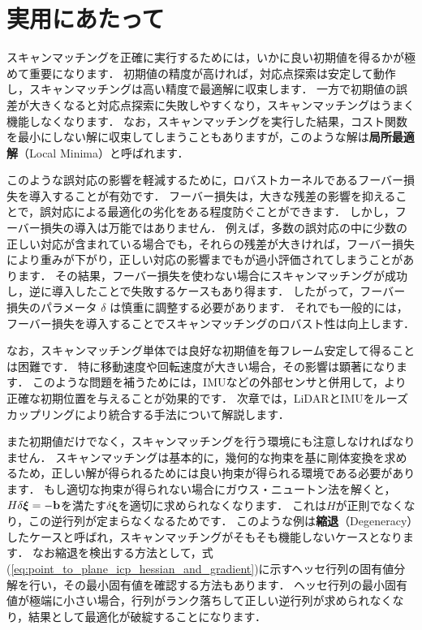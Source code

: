 \section{実用にあたって}
\label{sec:scan_matching_実用にあたって}

スキャンマッチングを正確に実行するためには，いかに良い初期値を得るかが極めて重要になります．
初期値の精度が高ければ，対応点探索は安定して動作し，スキャンマッチングは高い精度で最適解に収束します．
一方で初期値の誤差が大きくなると対応点探索に失敗しやすくなり，スキャンマッチングはうまく機能しなくなります．
なお，スキャンマッチングを実行した結果，コスト関数を最小にしない解に収束してしまうこともありますが，このような解は{\bf 局所最適解}（Local Minima）と呼ばれます．

このような誤対応の影響を軽減するために，ロバストカーネルであるフーバー損失を導入することが有効です．
フーバー損失は，大きな残差の影響を抑えることで，誤対応による最適化の劣化をある程度防ぐことができます．
しかし，フーバー損失の導入は万能ではありません．
例えば，多数の誤対応の中に少数の正しい対応が含まれている場合でも，それらの残差が大きければ，フーバー損失により重みが下がり，正しい対応の影響までもが過小評価されてしまうことがあります．
その結果，フーバー損失を使わない場合にスキャンマッチングが成功し，逆に導入したことで失敗するケースもあり得ます．
したがって，フーバー損失のパラメータ $\delta$ は慎重に調整する必要があります．
それでも一般的には，フーバー損失を導入することでスキャンマッチングのロバスト性は向上します．

なお，スキャンマッチング単体では良好な初期値を毎フレーム安定して得ることは困難です．
特に移動速度や回転速度が大きい場合，その影響は顕著になります．
このような問題を補うためには，IMUなどの外部センサと併用して，より正確な初期位置を与えることが効果的です．
次章では，LiDARとIMUをルーズカップリングにより統合する手法について解説します．

また初期値だけでなく，スキャンマッチングを行う環境にも注意しなければなりません．
スキャンマッチングは基本的に，幾何的な拘束を基に剛体変換を求めるため，正しい解が得られるためには良い拘束が得られる環境である必要があります．
もし適切な拘束が得られない場合にガウス・ニュートン法を解くと，$H \delta \boldsymbol \xi = -{\bf b}$を満たす$\delta \boldsymbol \xi$を適切に求められなくなります．
これは$H$が正則でなくなり，この逆行列が定まらなくなるためです．
このような例は{\bf 縮退}（Degeneracy）したケースと呼ばれ，スキャンマッチングがそもそも機能しないケースとなります．
なお縮退を検出する方法として，式(\ref{eq:point_to_plane_icp_hessian_and_gradient})に示すヘッセ行列の固有値分解を行い，その最小固有値を確認する方法もあります．
ヘッセ行列の最小固有値が極端に小さい場合，行列がランク落ちして正しい逆行列が求められなくなり，結果として最適化が破綻することになります．

